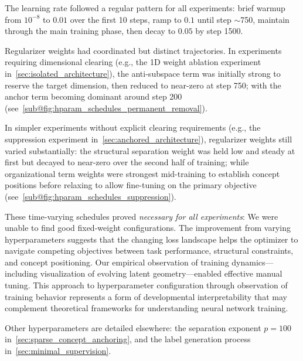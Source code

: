 The learning rate followed a regular pattern for all experiments: brief warmup from $10^{-8}$ to $0.01$ over the first 10 steps, ramp to $0.1$ until step $\sim$750, maintain through the main training phase, then decay to $0.05$ by step 1500.

Regularizer weights had coordinated but distinct trajectories. In experiments requiring dimensional clearing (e.g., the 1D weight ablation experiment in~\cref{sec:isolated_architecture}), the anti-subspace term was initially strong to reserve the target dimension, then reduced to near-zero at step 750; with the anchor term becoming dominant around step 200 (see~\cref{sub@fig:hparam_schedules_permanent_removal}).

In simpler experiments without explicit clearing requirements (e.g., the suppression experiment in~\cref{sec:anchored_architecture}), regularizer weights still varied substantially: the structural separation weight was held low and steady at first but decayed to near-zero over the second half of training; while organizational term weights were strongest mid-training to establish concept positions before relaxing to allow fine-tuning on the primary objective (see~\cref{sub@fig:hparam_schedules_suppression}).

These time-varying schedules proved \emph{necessary for all experiments}: We were unable to find good fixed-weight configurations. The improvement from varying hyperparameters suggests that the changing loss landscape helps the optimizer to navigate competing objectives between task performance, structural constraints, and concept positioning. Our empirical observation of training dynamics---including visualization of evolving latent geometry---enabled effective manual tuning. This approach to hyperparameter configuration through observation of training behavior represents a form of developmental interpretability that may complement theoretical frameworks for understanding neural network training.

Other hyperparameters are detailed elsewhere: the separation exponent $p=100$ in~\cref{sec:sparse_concept_anchoring}, and the label generation process in~\cref{sec:minimal_supervision}.
